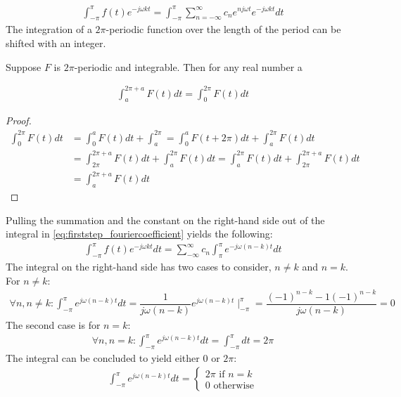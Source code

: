 \begin{align} \label{eq:firststep_fouriercoefficient}
	\int_{-\pi}^\pi f(t)e^{-j\omega k t} = \int_{-\pi}^\pi \sum_{n=-\infty}^{\infty} c_n e^{n j\omega t} e^{-j\omega k t} dt
\end{align}
The integration of a $2\pi$-periodic function over the length of the period can be shifted with an integer.

\begin{lemma}\label{lemma:2pi-periodic_function}
Suppose $F$ is $2\pi$-periodic and integrable. Then for any real number a 

\begin{align}
\int_a^{2\pi+a}F(t) dt = \int_0^{2\pi}F(t)dt
\end{align}
\end{lemma}
\begin{proof}
\begin{align*}
	\int_0^{2\pi}F(t)dt 
	&= \int_0^a F(t) dt + \int_a^{2\pi} 
	= \int_0^a F(t+2\pi)dt + \int_a^{2\pi} F(t) dt\\ 
	&= \int_{2\pi}^{2\pi + a} F(t) dt + \int_a^{2\pi}F(t)dt
	= \int_a^{2\pi}F(t)dt	+ \int_{2\pi}^{2\pi + a} F(t)dt \\
	&= \int_a^{2\pi+a}F(t)dt
\end{align*}
\end{proof}
Pulling the summation and the constant on the right-hand side out of the integral in \eqref{eq:firststep_fouriercoefficient} yields the following:
\begin{align*}
	\int_{-\pi}^\pi f(t) e^{-j \omega k t}dt
	= \sum_{-\infty}^\infty c_n \int_{\pi}^\pi e^{-j \omega(n-k)t}dt
\end{align*} 
The integral on the right-hand side has two cases to consider, $n \neq k$ and $n = k$. For $n\neq k$:
\begin{align*}
	\forall n,n\neq k: \int_{-\pi}^\pi e^{j\omega(n-k)t}dt 
	=\dfrac{1}{j\omega(n-k)}e^{j\omega(n-k)t}\mid_{-\pi}^{\pi}
	=\dfrac{(-1)^{n-k}-1(-1)^{n-k}}{j\omega(n-k)}
	=0
\end{align*}
The second case is for $n = k$:
\begin{align*}
	\forall n,n=k: \int_{-\pi}^\pi e^{j\omega(n-k)t}dt = \int_{-\pi}^\pi dt = 2\pi
\end{align*}
The integral can be concluded to yield either $0$ or $2\pi$:
\begin{align}
	\int_{-\pi}^{\pi} e^{j \omega (n-k)t}dt 
	= 
	\begin{cases}
			2\pi \text{ if } n=k\\
			0 \text{ otherwise}
	\end{cases}
\end{align}
